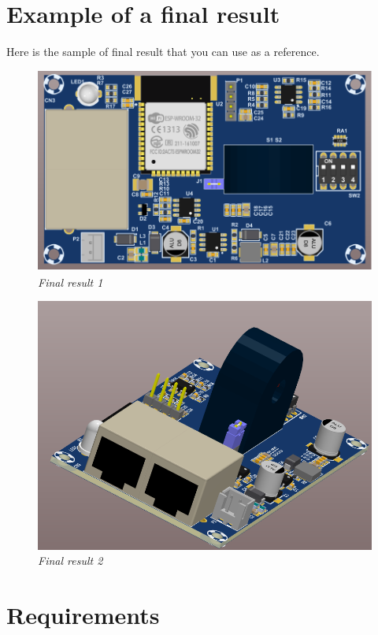 \newpage
\section{Example of a final result}
Here is the sample of final result that you can use as a reference. 
\begin{figure}[!htp]
    \centering
    \includegraphics[width=5in]{source/picture/bai_7/bai7_3d_1.png}
    \caption{\textit{Final result 1}}
    \label{bai7_3d_1}
\end{figure}

\begin{figure}[!htp]
    \centering
    \includegraphics[width=5in]{source/picture/bai_7/bai7_3d_2.png}
    \caption{\textit{Final result 2}}
    \label{bai7_3d_2}
\end{figure}

\newpage
\section{Requirements}
